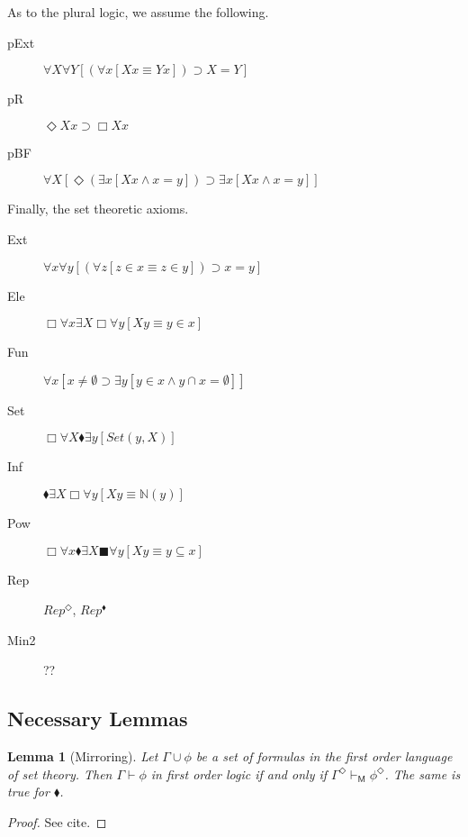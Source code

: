 \documentclass{article}
\newcommand\D{\blacklozenge}
\newcommand\B{\blacksquare}
\newtheorem{lemma}{Lemma}
\begin{document}
As to the plural logic, we assume the following.
\begin{description}
    \item[pExt] $\forall X \forall Y [(\forall x[Xx \equiv Yx]) \supset X = Y]$
    \item[pR] $ \Diamond Xx \supset \Box Xx$
    \item[pBF] $\forall X[ \Diamond (\exists x[Xx \wedge x = y]) \supset \exists x [Xx \wedge x = y]]$
\end{description}
Finally, the set theoretic axioms.
\begin{description}
    \item[Ext] $\forall x \forall y [(\forall z[z \in x \equiv z \in y]) \supset x = y]$
    \item[Ele] $\Box \forall x \exists X \Box \forall y[Xy \equiv y \in x]$
    \item[Fun] $\forall x[ x \not = \emptyset \supset \exists y[y \in x \wedge y \cap x = \emptyset]]$
    \item[Set] $\Box \forall X \D \exists y [Set(y, X)]$
    \item[Inf] $\D \exists X\Box \forall y[Xy \equiv \mathbb{N}(y)]$
    \item[Pow] $\Box \forall x \D \exists X \B \forall y [Xy \equiv y \subseteq x]$
    \item[Rep] $Rep^\Diamond$, $Rep^\D$
    \item[Min2] ??
\end{description}
\subsection{Necessary Lemmas}
\begin{lemma}[Mirroring]
    Let $\Gamma 
    \cup {\phi}$ be a set of formulas in the first order language of set theory. Then
    $\Gamma \vdash \phi$ in first order logic if and only if 
    $\Gamma^\Diamond \vdash_\mathsf{M} \phi^\Diamond$. 
    The same is true for $\blacklozenge$.
\end{lemma}
\begin{proof}
    See cite.
\end{proof}
\end{document}
